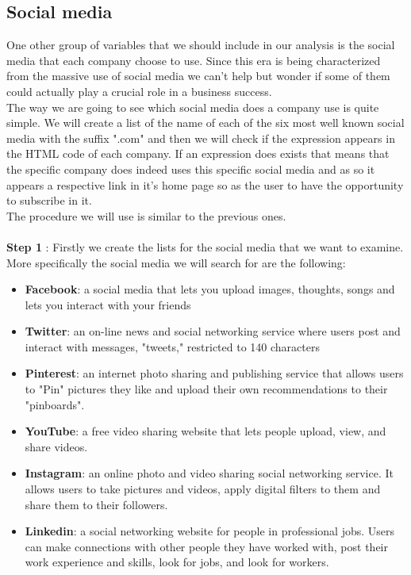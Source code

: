 \documentclass{book}
\begin{document}
\subsection{Social media}
One other group of variables that we should include in our analysis is the social media that each company choose to use. Since this era is being characterized from the massive use of social media we can't help but wonder if some of them could actually play a crucial role in a business success.\\
The way we are going to see which social media does a company use is quite simple. We will create a list of the name of each of the  six most well known social media with the suffix ".com" and then we will check if the expression appears in the HTML code of each company. If an expression does exists that means that the specific company does indeed uses this specific social media and as so it appears a respective link in it's home page so as the user to have the opportunity to subscribe in it.\\
The procedure we will use is similar to the previous ones.\\\\
\textbf{Step 1} : Firstly we create the lists for the social media that we want to examine. More specifically the social media we will search for are the following:
\begin{itemize}
\item\textbf{Facebook}: a social media that lets you upload images, thoughts, songs and lets you interact with your friends
\item\textbf{Twitter}: an on-line news and social networking service where users post and interact with messages, "tweets," restricted to 140 characters
\item\textbf{Pinterest}: an internet photo sharing and publishing service that allows users to "Pin" pictures they like and upload their own recommendations to their "pinboards".
\item\textbf{YouTube}: a free video sharing website that lets people upload, view, and share videos. 
\item\textbf{Instagram}: an online photo and video sharing social networking service. It allows users to take pictures and videos, apply digital filters to them and share them to their followers. 
\item\textbf{Linkedin}: a social networking website for people in professional jobs. Users can make connections with other people they have worked with, post their work experience and skills, look for jobs, and look for workers.
\end{itemize}
\end{document}
